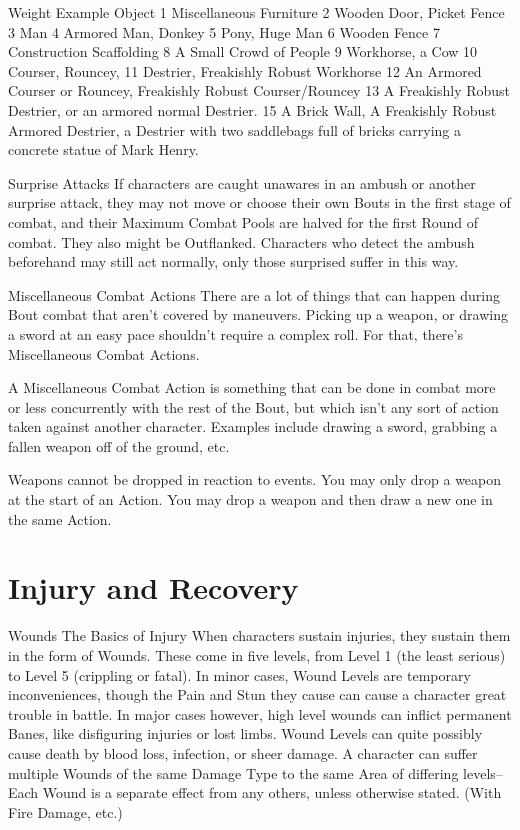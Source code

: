 \documentclass[oneside,11pt,english]{book}
\begin{document}
 

 

Weight Example Object 
1 Miscellaneous Furniture 
2 Wooden Door, Picket Fence 
3 Man 
4 Armored Man, Donkey 
5 Pony, Huge Man 
6 Wooden Fence 
7 Construction Scaffolding 
8 A Small Crowd of People 
9 Workhorse, a Cow 
10 Courser, Rouncey, 
11 Destrier, Freakishly Robust Workhorse 
12 An Armored Courser or Rouncey, Freakishly Robust Courser/Rouncey 
13 A Freakishly Robust Destrier, or an armored normal Destrier. 
15 A Brick Wall, A Freakishly Robust Armored Destrier, a Destrier with two saddlebags full of 
bricks carrying a concrete statue of Mark Henry. 

 

 

 

Surprise Attacks 
If characters are caught unawares in an ambush or another surprise attack, they may not move or choose 
their own Bouts in the first stage of combat, and their Maximum Combat Pools are halved for the first 
Round of combat. They also might be Outflanked. 
Characters who detect the ambush beforehand may still act normally, only those surprised suffer in this 
way. 

 

 

Miscellaneous Combat Actions 
There are a lot of things that can happen during Bout combat that aren’t covered by maneuvers. Picking 
up a weapon, or drawing a sword at an easy pace shouldn’t require a complex roll. For that, there’s 
Miscellaneous Combat Actions. 

 

A Miscellaneous Combat Action is something that can be done in combat more or less concurrently with 
the rest of the Bout, but which isn’t any sort of action taken against another character. Examples include 
drawing a sword, grabbing a fallen weapon off of the ground, etc. 


 

Weapons cannot be dropped in reaction to events. You may only drop a weapon at the start of an 
Action. You may drop a weapon and then draw a new one in the same Action. 

 

\chapter{Injury and Recovery}\label{ch:injuryrecovery}
\startcontents[chapters]
\clearpage
Wounds 
The Basics of Injury 
When characters sustain injuries, they sustain them in the form of Wounds. These come in five levels, 
from Level 1 (the least serious) to Level 5 (crippling or fatal). In minor cases, Wound Levels are 
temporary inconveniences, though the Pain and Stun they cause can cause a character great trouble in 
battle. In major cases however, high level wounds can inflict permanent Banes, like disfiguring injuries or 
lost limbs. Wound Levels can quite possibly cause death by blood loss, infection, or sheer damage. A 
character can suffer multiple Wounds of the same Damage Type to the same Area of differing levels--
Each Wound is a separate effect from any others, unless otherwise stated. (With Fire Damage, etc.) 
\end{document}
